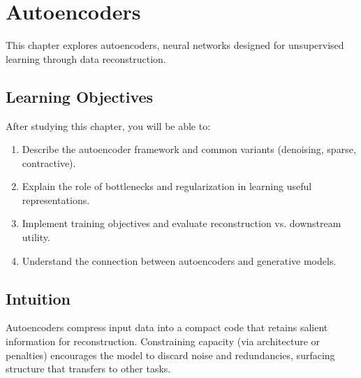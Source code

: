 
\chapter{Autoencoders}
\label{chap:autoencoders}

This chapter explores autoencoders, neural networks designed for unsupervised learning through data reconstruction.


\section*{Learning Objectives}

After studying this chapter, you will be able to:

\begin{enumerate}
    \item Describe the autoencoder framework and common variants (denoising, sparse, contractive).
    \item Explain the role of bottlenecks and regularization in learning useful representations.
    \item Implement training objectives and evaluate reconstruction vs. downstream utility.
    \item Understand the connection between autoencoders and generative models.
\end{enumerate}


\section*{Intuition}

Autoencoders compress input data into a compact code that retains salient information for reconstruction. Constraining capacity (via architecture or penalties) encourages the model to discard noise and redundancies, surfacing structure that transfers to other tasks.











